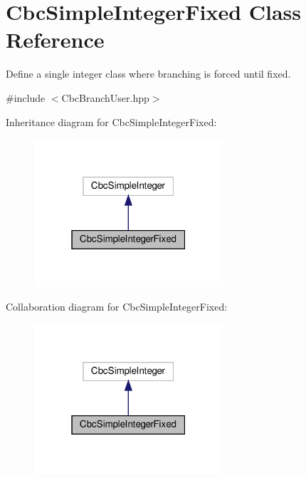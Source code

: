 \hypertarget{classCbcSimpleIntegerFixed}{}\section{Cbc\+Simple\+Integer\+Fixed Class Reference}
\label{classCbcSimpleIntegerFixed}


Define a single integer class where branching is forced until fixed.  




{\ttfamily \#include $<$Cbc\+Branch\+User.\+hpp$>$}



Inheritance diagram for Cbc\+Simple\+Integer\+Fixed\+:
\nopagebreak
\begin{figure}[H]
\begin{center}
\leavevmode
\includegraphics[width=199pt]{d3/dd3/classCbcSimpleIntegerFixed__inherit__graph}
\end{center}
\end{figure}


Collaboration diagram for Cbc\+Simple\+Integer\+Fixed\+:
\nopagebreak
\begin{figure}[H]
\begin{center}
\leavevmode
\includegraphics[width=199pt]{d6/dcb/classCbcSimpleIntegerFixed__coll__graph}
\end{center}
\end{figure}
